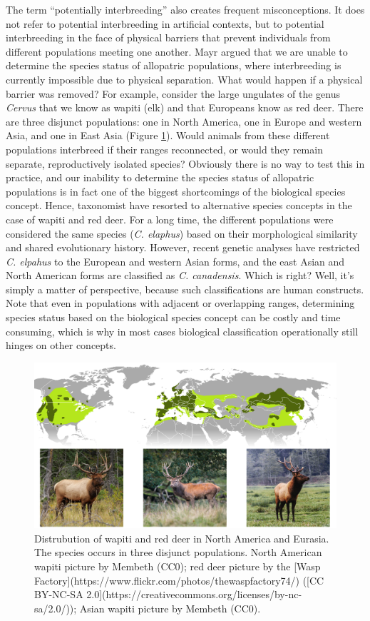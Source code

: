 \documentclass[
]{book}
\begin{document}
The term ``potentially interbreeding'' also creates frequent misconceptions. It does not refer to potential interbreeding in artificial contexts, but to potential interbreeding in the face of physical barriers that prevent individuals from different populations meeting one another. Mayr argued that we are unable to determine the species status of allopatric populations, where interbreeding is currently impossible due to physical separation. What would happen if a physical barrier was removed? For example, consider the large ungulates of the genus \emph{Cervus} that we know as wapiti (elk) and that Europeans know as red deer. There are three disjunct populations: one in North America, one in Europe and western Asia, and one in East Asia (Figure \ref{fig:wapiti}). Would animals from these different populations interbreed if their ranges reconnected, or would they remain separate, reproductively isolated species? Obviously there is no way to test this in practice, and our inability to determine the species status of allopatric populations is in fact one of the biggest shortcomings of the biological species concept. Hence, taxonomist have resorted to alternative species concepts in the case of wapiti and red deer. For a long time, the different populations were considered the same species (\emph{C. elaphus}) based on their morphological similarity and shared evolutionary history. However, recent genetic analyses have restricted \emph{C. elpahus} to the European and western Asian forms, and the east Asian and North American forms are classified as \emph{C. canadensis}. Which is right? Well, it's simply a matter of perspective, because such classifications are human constructs. Note that even in populations with adjacent or overlapping ranges, determining species status based on the biological species concept can be costly and time consuming, which is why in most cases biological classification operationally still hinges on other concepts.

\begin{figure}
\includegraphics[width=1\linewidth]{images/Wapiti} \caption{Distrubution of wapiti and red deer in North America and Eurasia. The species occurs in three disjunct populations. North American wapiti picture by Membeth (CC0); red deer picture by the [Wasp Factory](https://www.flickr.com/photos/thewaspfactory74/) ([CC BY-NC-SA 2.0](https://creativecommons.org/licenses/by-nc-sa/2.0/)); Asian wapiti picture by Membeth (CC0).}\label{fig:wapiti}
\end{figure}
\end{document}
